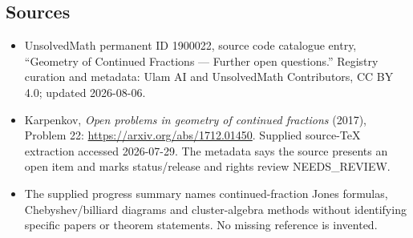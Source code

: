 \documentclass[11pt]{article}
\begin{document}
\subsection{Sources}
\begin{itemize}
\item UnsolvedMath permanent ID 1900022, source code catalogue entry, ``Geometry of Continued Fractions --- Further open questions.'' Registry curation and metadata: Ulam AI and UnsolvedMath Contributors, CC BY 4.0; updated 2026-08-06.
\item Karpenkov, \emph{Open problems in geometry of continued fractions} (2017), Problem 22: \url{https://arxiv.org/abs/1712.01450}. Supplied source-TeX extraction accessed 2026-07-29. The metadata says the source presents an open item and marks status/release and rights review NEEDS\_REVIEW.
\item The supplied progress summary names continued-fraction Jones formulas, Chebyshev/billiard diagrams and cluster-algebra methods without identifying specific papers or theorem statements. No missing reference is invented.
\end{itemize}
\end{document}
